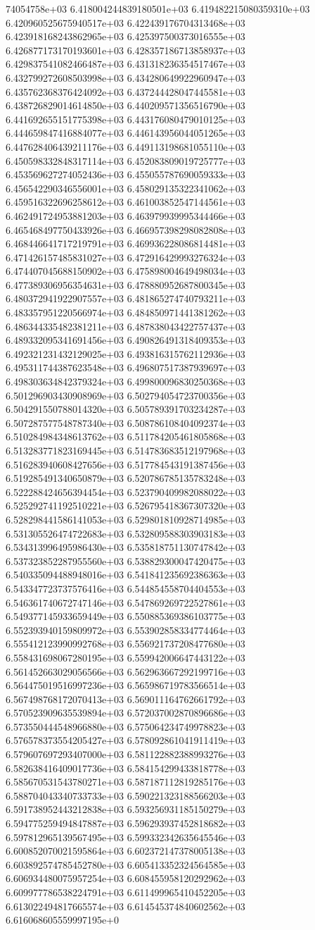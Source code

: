74054758e+03	6.418004244839180501e+03	6.419482215080359310e+03	6.420960525675940517e+03	6.422439176704313468e+03	6.423918168243862965e+03	6.425397500373016555e+03	6.426877173170193601e+03	6.428357186713858937e+03	6.429837541082466487e+03	6.431318236354517467e+03	6.432799272608503998e+03	6.434280649922960947e+03	6.435762368376424092e+03	6.437244428047445581e+03	6.438726829014614850e+03	6.440209571356516790e+03	6.441692655151775398e+03	6.443176080479010125e+03	6.444659847416884077e+03	6.446143956044051265e+03	6.447628406439211176e+03	6.449113198681055110e+03	6.450598332848317114e+03	6.452083809019725777e+03	6.453569627274052436e+03	6.455055787690059333e+03	6.456542290346556001e+03	6.458029135322341062e+03	6.459516322696258612e+03	6.461003852547144561e+03	6.462491724953881203e+03	6.463979939995344466e+03	6.465468497750433926e+03	6.466957398298082808e+03	6.468446641717219791e+03	6.469936228086814481e+03	6.471426157485831027e+03	6.472916429993276324e+03	6.474407045688150902e+03	6.475898004649498034e+03	6.477389306956354631e+03	6.478880952687800345e+03	6.480372941922907557e+03	6.481865274740793211e+03	6.483357951220566974e+03	6.484850971441381262e+03	6.486344335482381211e+03	6.487838043422757437e+03	6.489332095341691456e+03	6.490826491318409353e+03	6.492321231432129025e+03	6.493816315762112936e+03	6.495311744387623548e+03	6.496807517387939697e+03	6.498303634842379324e+03	6.499800096830250368e+03	6.501296903430908969e+03	6.502794054723700356e+03	6.504291550788014320e+03	6.505789391703234287e+03	6.507287577548787340e+03	6.508786108404092374e+03	6.510284984348613762e+03	6.511784205461805868e+03	6.513283771823169445e+03	6.514783683512197968e+03	6.516283940608427656e+03	6.517784543191387456e+03	6.519285491340650879e+03	6.520786785135783248e+03	6.522288424656394454e+03	6.523790409982088022e+03	6.525292741192510221e+03	6.526795418367307320e+03	6.528298441586141053e+03	6.529801810928714985e+03	6.531305526474722683e+03	6.532809588303903183e+03	6.534313996495986430e+03	6.535818751130747842e+03	6.537323852287955560e+03	6.538829300047420475e+03	6.540335094488948016e+03	6.541841235692386363e+03	6.543347723737576416e+03	6.544854558704404553e+03	6.546361740672747146e+03	6.547869269722527861e+03	6.549377145933659449e+03	6.550885369386103775e+03	6.552393940159809972e+03	6.553902858334774464e+03	6.555412123990992768e+03	6.556921737208477680e+03	6.558431698067280195e+03	6.559942006647443122e+03	6.561452663029056566e+03	6.562963667292199716e+03	6.564475019516997236e+03	6.565986719783566514e+03	6.567498768172070413e+03	6.569011164762661792e+03	6.570523909635539894e+03	6.572037002870896686e+03	6.573550444548966880e+03	6.575064234749978823e+03	6.576578373554205427e+03	6.578092861041911419e+03	6.579607697293407000e+03	6.581122882388993276e+03	6.582638416409017736e+03	6.584154299433818778e+03	6.585670531543780271e+03	6.587187112819285176e+03	6.588704043340733733e+03	6.590221323188566203e+03	6.591738952443212838e+03	6.593256931185150279e+03	6.594775259494847887e+03	6.596293937452818682e+03	6.597812965139567495e+03	6.599332342635645546e+03	6.600852070021595864e+03	6.602372147378005138e+03	6.603892574785452780e+03	6.605413352324564585e+03	6.606934480075957254e+03	6.608455958120292962e+03	6.609977786538224791e+03	6.611499965410452205e+03	6.613022494817665574e+03	6.614545374840602562e+03	6.616068605559997195e+0